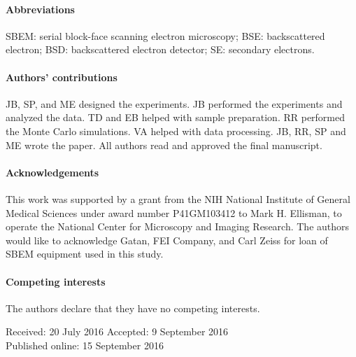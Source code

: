 \documentclass{article}
\begin{document}
\paragraph{Abbreviations} SBEM: serial block-face scanning electron microscopy; BSE: backscattered electron; BSD: backscattered electron detector; SE: secondary electrons.

\paragraph{Authors’ contributions} JB, SP, and ME designed the experiments. JB performed the experiments and analyzed the data. TD and EB helped with sample preparation. RR performed the Monte Carlo simulations. VA helped with data processing. JB, RR, SP and ME wrote the paper. All authors read and approved the final manuscript.

\paragraph{Acknowledgements} This work was supported by a grant from the NIH National Institute of General Medical Sciences under award number P41GM103412 to Mark H. Ellisman, to operate the National Center for Microscopy and Imaging Research. The authors would like to acknowledge Gatan, FEI Company, and Carl Zeiss for loan of SBEM equipment used in this study.

\paragraph{Competing interests} The authors declare that they have no competing interests.

\noindent Received: 20 July 2016 \quad Accepted: 9 September 2016\\
Published online: 15 September 2016\par
{}
\end{document}
